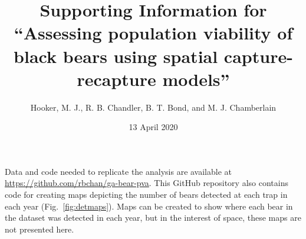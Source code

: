 \documentclass[12pt]{article}
\title{\Large Supporting Information for ``Assessing population viability of
  black bears using spatial capture-recapture models''}
\author{Hooker, M. J., R. B. Chandler, B. T. Bond, and M. J. Chamberlain}
\date{13 April 2020}
\begin{document}
\maketitle


Data and code needed to replicate the analysis are available at
\url{https://github.com/rbchan/ga-bear-pva}. This GitHub repository
also contains code for creating maps depicting the number of bears
detected at each trap in each year (Fig.~\ref{fig:detmaps}). Maps can
be created to show where each bear in the dataset was detected in each
year, but in the interest of space, these maps are not presented
here. 
\end{document}
